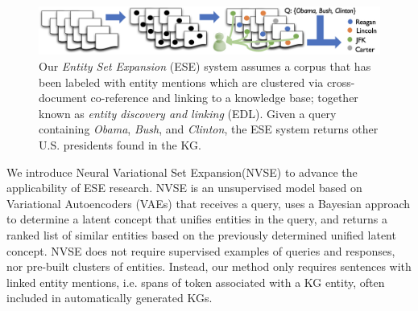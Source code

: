 \documentclass[a4paper]{article}
\newcommand{\Todo}[2][red]{\todo[]{\textcolor{#1}{\footnotesize #2}}}
\newcommand{\er}{ESE\xspace}
\newcommand{\erLong}{Entity Set Expansion\xspace}
\newcommand{\nvge}{NVSE\xspace}
\newcommand{\nvgeLong}{Neural Variational Set Expansion\xspace}
\begin{document}
%

\begin{figure}[t]
  \centering
  \includegraphics[width=\linewidth,trim=0 0 0 0,clip]{er-pipeline.png}
  \caption{ %
    Our \emph{\erLong} (\er) system assumes a corpus that has been labeled with entity mentions which are clustered via cross-document co-reference and linking to a knowledge base; together known as \emph{entity discovery and linking} (EDL). Given a query containing \textit{Obama},
\textit{Bush}, and \textit{Clinton}, the \er system returns other U.S. presidents found in the KG. }
  \label{fig:ff1}
\end{figure}


We introduce \nvgeLong (\nvge) to advance the applicability of ESE research. %
 \nvge is an unsupervised model based on Variational Autoencoders (VAEs) that
 receives a query, %
 uses a Bayesian approach to determine a latent concept
 that unifies entities in the query,
 and returns %
 a ranked list of %
 similar entities based on the previously determined unified latent concept.
%
 \nvge does not require supervised examples of queries and responses,
 nor pre-built clusters of entities. %
 Instead, our method
 only requires sentences with linked entity
 mentions, i.e. spans of token associated with a KG entity, %
 often included in automatically generated KGs.
\end{document}
